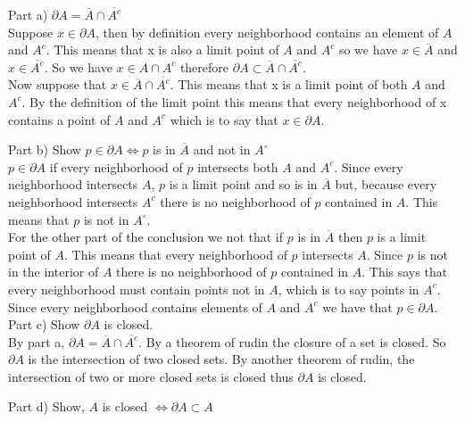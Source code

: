 \documentclass[11pt,reqno]{article}
\begin{document}
\noindent Part a) $\partial A = \overline{A} \cap \overline{A^c}$ \\ \newline
\indent Suppose $x \in \partial A$, then by definition every neighborhood contains an element of $A$ and $A^c$. This means that x is also a limit point of $A$ and $A^c$ so we have $x \in \overline{A}$ and $x \in \overline{A^c}$. So we have $x \in A \cap A^c$ therefore $\partial A \subset \overline{A} \cap \overline{A^c}$.\\
\indent Now suppose that $x \in \overline{A} \cap \overline{A^c}$. This means that x is a limit point of both $A$ and $A^c$. By the definition of the limit point this means that every neighborhood of x contains a point of $A$ and $A^c$ which is to say that $x \in \partial A$. \newline

\noindent Part b) Show $p \in \partial A \iff p$ is in $\overline{A}$ and not in $A^\circ$ \\ \newline
\indent $p \in \partial A$ if every neighborhood of $p$ intersects both $A$ and $A^c$. Since every neighborhood intersects $A$, $p$ is a limit point and so is in $\overline{A}$ but, because every neighborhood intersects $A^c$ there is no neighborhood of $p$ contained in $A$. This means that
$p$ is not in $A^\circ$. \\ 
\indent For the other part of the conclusion we not that if $p$ is in $\overline{A}$ then $p$ is a limit point of $A$. This means that every neighborhood of $p$ intersects $A$. Since $p$ is not in the interior of $A$ there is no neighborhood of $p$ contained in $A$. This says that every neighborhood must contain points not in $A$, which is to say points in $A^c$. Since every neighborhood contains  elements of $A$ and $A^c$ we have that $p \in \partial A$.\\ \newline
\noindent Part c) Show $\partial A$ is closed. \\ \newline
\indent By part a, $\partial A = \overline{A} \cap \overline{A^c}$. By a theorem of rudin the closure of a set is closed. So $\partial A$ is the intersection of two closed sets. By another theorem of rudin, the intersection of two or more closed sets is closed thus $\partial A$ is closed. \newline

\noindent Part d) Show, $A$ is closed $\iff \partial A \subset A$ \\
\end{document}

